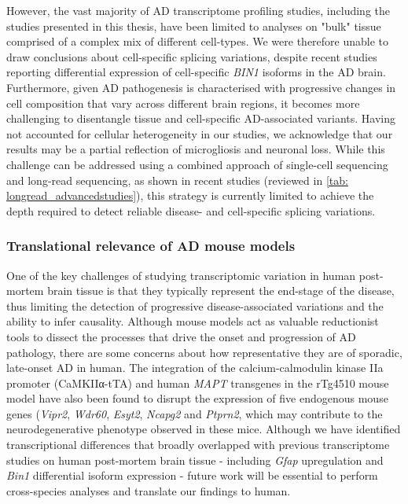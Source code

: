 However, the vast majority of AD transcriptome profiling studies, including the studies presented in this thesis, have been limited to analyses on "bulk" tissue comprised of a complex mix of different cell-types. We were therefore unable to draw conclusions about cell-specific splicing variations, despite recent studies reporting differential expression of cell-specific \textit{BIN1} isoforms in the AD brain. Furthermore, given AD pathogenesis is characterised with progressive changes in cell composition that vary across different brain regions, it becomes more challenging to disentangle tissue and cell-specific AD-associated variants. Having not accounted for cellular heterogeneity in our studies, we acknowledge that our results may be a partial reflection of microgliosis and neuronal loss. While this challenge can be addressed using a combined approach of single-cell sequencing and long-read sequencing, as shown in recent studies (reviewed in \cref{tab: longread_advancedstudies}), this strategy is currently limited to achieve the depth required to detect reliable disease- and cell-specific splicing variations. 

\subsubsection{Translational relevance of AD mouse models}
One of the key challenges of studying transcriptomic variation in human post-mortem brain tissue is that they typically represent the end-stage of the disease, thus limiting the detection of progressive disease-associated variations and the ability to infer causality. Although mouse models act as valuable reductionist tools to dissect the processes that drive the onset and progression of AD pathology, there are some concerns about how representative they are of sporadic, late-onset AD in human. The integration of the calcium-calmodulin kinase IIa promoter (CaMKIIα-tTA) and human \textit{MAPT} transgenes in the rTg4510 mouse model have also been found to disrupt the expression of five endogenous mouse genes (\textit{Vipr2}, \textit{Wdr60}, \textit{Esyt2}, \textit{Ncapg2} and \textit{Ptprn2}, which may contribute to the neurodegenerative phenotype observed in these mice\cite{Castanho2020,Gamache2019}. Although we have identified transcriptional differences that broadly overlapped with previous transcriptome studies on human post-mortem brain tissue - including \textit{Gfap} upregulation and \textit{Bin1} differential isoform expression - future work will be essential to perform cross-species analyses and translate our findings to human.      
	
